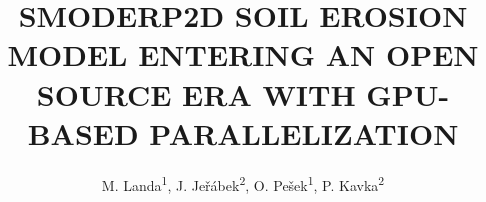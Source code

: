 \documentclass{isprs} %
\begin{document}
\title{SMODERP2D SOIL EROSION MODEL ENTERING AN OPEN SOURCE ERA WITH
  GPU-BASED PARALLELIZATION}

\author{
 M. Landa\textsuperscript{1}, J. Jeřábek\textsuperscript{2}, O. Pešek\textsuperscript{1}, P. Kavka\textsuperscript{2}}

\address{
  \textsuperscript{1 }Dept.\ of Geomatics, Faculty of Civil Engineering, Czech Technical University in Prague,\\ Czech Republic - (martin.landa, ondrej.pesek)@fsv.cvut.cz\\
  \textsuperscript{2 }Dept.\ of Landscape Water Conservation, Faculty of Civil Engineering, Czech Technical University in Prague,\\ Czech Republic - (jakub.jerabek, petr.kavka)@fsv.cvut.cz\\
}



\icwg{}   %
\end{document}
